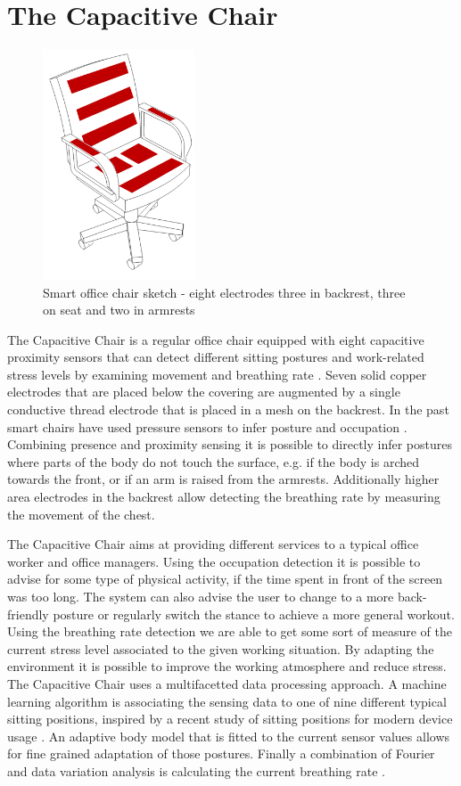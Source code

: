 \section{The Capacitive Chair}
\begin{figure}[h]
\centering
\includegraphics[width=0.4\textwidth]{images/smartofficechair}
\caption{Smart office chair sketch - eight electrodes three in backrest, three on seat and two in armrests}
\label{fig:smartchair_sketch}
\end{figure}
The Capacitive Chair is a regular office chair equipped with eight capacitive proximity sensors that can detect different sitting postures and work-related stress levels by examining movement and breathing rate \cite{Braun2013ChairAid}. Seven solid copper electrodes that are placed below the covering are augmented by a single conductive thread electrode that is placed in a mesh on the backrest. In the past smart chairs have used pressure sensors to infer posture and occupation \cite{tan2001sensing}. Combining presence and proximity sensing it is possible to directly infer postures where parts of the body do not touch the surface, e.g. if the body is arched towards the front, or if an arm is raised from the armrests. Additionally higher area electrodes in the backrest allow detecting the breathing rate by measuring the movement of the chest.

The Capacitive Chair aims at providing different services to a typical office worker and office managers. Using the occupation detection it is possible to advise for some type of physical activity, if the time spent in front of the screen was too long. The system can also advise the user to change to a more back-friendly posture or regularly switch the stance to achieve a more general workout. Using the breathing rate detection we are able to get some sort of measure of the current stress level associated to the given working situation. By adapting the environment it is possible to improve the working atmosphere and reduce stress. The Capacitive Chair uses a multifacetted data processing approach. A machine learning algorithm is associating the sensing data to one of nine different typical sitting positions, inspired by a recent study of sitting positions for modern device usage \cite{globalPosture}. An adaptive body model that is fitted to the current sensor values allows for fine grained adaptation of those postures. Finally a combination of Fourier and data variation analysis is calculating the current breathing rate \cite{Braun2013ChairAid}.


